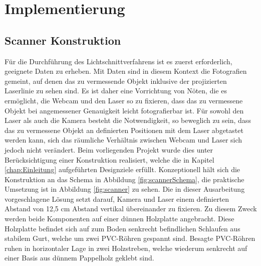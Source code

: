 \chapter{Implementierung}
\label{chap:Implementierung}

\section{Scanner Konstruktion}
\label{sec:scannerKonstruktion}
Für die Durchführung des Lichtschnittverfahrens ist es zuerst erforderlich, geeignete Daten zu erheben. Mit Daten sind in diesem Kontext die Fotografien gemeint, auf denen das zu vermessende Objekt inklusive der projizierten Laserlinie zu sehen sind. Es ist daher eine Vorrichtung von Nöten, die es ermöglicht, die Webcam und den Laser so zu fixieren, dass das zu vermessene Objekt bei angemessener Genauigkeit leicht fotografierbar ist. Für sowohl den Laser als auch die Kamera besteht die Notwendigkeit, so beweglich zu sein, dass das zu vermessene Objekt an definierten Positionen mit dem Laser abgetastet werden kann, sich das räumliche Verhältnis zwischen Webcam und Laser sich jedoch nicht verändert. Beim vorliegenden Projekt wurde dies unter Berücksichtigung einer Konstruktion realisiert, welche die in Kapitel \ref{chap:Einleitung} aufgeführten Designziele erfüllt. Konzeptionell hält sich die Konstruktion an das Schema in Abbildung \ref{fig:scannerSchema}, die praktische Umsetzung ist in Abbildung \ref{fig:scanner} zu sehen. Die in dieser Ausarbeitung vorgeschlagene Lösung setzt darauf, Kamera und Laser einem definierten Abstand von 12,5 cm Abstand vertikal übereinander zu fixieren. Zu diesem Zweck werden beide Komponenten auf einer dünnen Holzplatte angebracht. Diese Holzplatte befindet sich auf zum Boden senkrecht befindlichen Schlaufen aus stabilem Gurt, welche um zwei PVC-Röhren gespannt sind. Besagte PVC-Röhren ruhen in horizontaler Lage in zwei Holzstreben, welche wiederum senkrecht auf einer Basis aus dünnem Pappelholz geklebt sind. 


